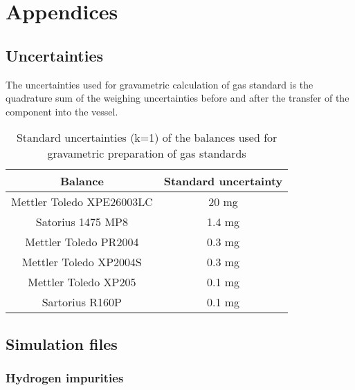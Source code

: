 \chapter*{Appendices}
\section*{Uncertainties}
The uncertainties used for gravametric calculation of gas standard is the quadrature sum of the weighing uncertainties before and after the transfer of the component into the vessel.
\begin{table}[H]
    \centering
    \begin{tabular}{@{}cc@{}}
    \toprule
    Balance                   & Standard uncertainty \\ \midrule
    Mettler Toledo XPE26003LC & 20 mg                \\
    Satorius 1475 MP8         & 1.4 mg               \\
    Mettler Toledo PR2004     & 0.3 mg               \\
    Mettler Toledo XP2004S    & 0.3 mg               \\
    Mettler Toledo XP205      & 0.1 mg               \\
    Sartorius R160P           & 0.1 mg               \\ \bottomrule
    \end{tabular}
    \caption{Standard uncertainties (k=1) of the balances used for gravametric preparation of gas standards}
\end{table}
\section*{Simulation files}
\subsection*{Hydrogen impurities}
